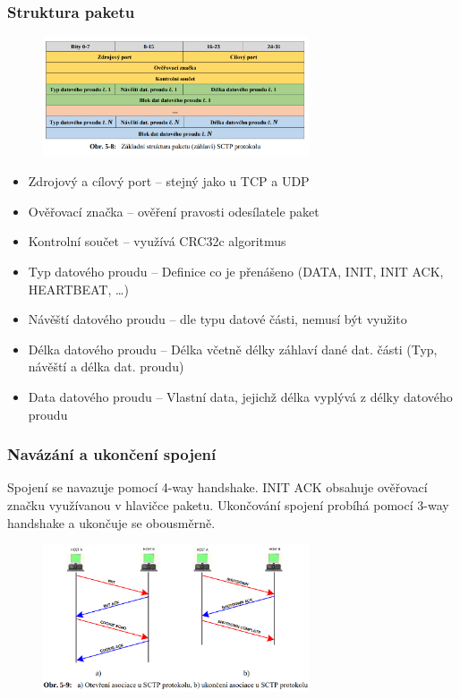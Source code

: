 \subsubsection{Struktura paketu}

\begin{figure}[!h]
    \centering
    \includegraphics[width=0.7\textwidth]{obrazky/033.png}
\end{figure}

\begin{itemize}[noitemsep]
    \item Zdrojový a cílový port -- stejný jako u TCP a UDP
    \item Ověřovací značka -- ověření pravosti odesílatele paket
    \item Kontrolní součet -- využívá CRC32c algoritmus
    \item Typ datového proudu -- Definice co je přenášeno (DATA, INIT, INIT ACK, HEARTBEAT, \dots)
    \item Návěští datového proudu -- dle typu datové části, nemusí být využito
    \item Délka datového proudu -- Délka včetně délky záhlaví dané dat. části (Typ, návěští a délka dat. proudu)
    \item Data datového proudu -- Vlastní data, jejichž délka vyplývá z délky datového proudu
\end{itemize}

\subsubsection{Navázání a ukončení spojení}

Spojení se navazuje pomocí 4-way handshake.
INIT ACK obsahuje ověřovací značku využívanou v hlavičce paketu.
Ukončování spojení probíhá pomocí 3-way handshake a ukončuje se obousměrně.

\begin{figure}[!h]
    \centering
    \includegraphics[width=0.7\textwidth]{obrazky/034.png}
\end{figure}

